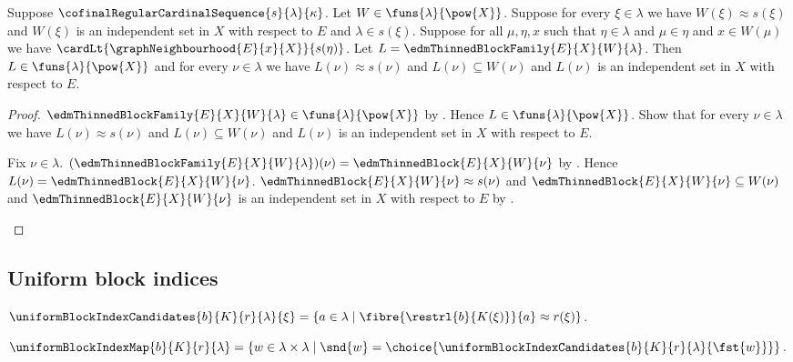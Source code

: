 \begin{theorem}\label{edm_thinned_block_family_properties}
    Suppose $\cofinalRegularCardinalSequence{s}{\lambda}{\kappa}$.
    Let $W\in\funs{\lambda}{\pow{X}}$.
    Suppose for every $\xi\in\lambda$ we have
        $W(\xi)\approx s(\xi)$ and
        $W(\xi)$ is an independent set in $X$ with respect to $E$ and
        $\lambda\in s(\xi)$.
    Suppose for all $\mu,\eta,x$ such that $\eta\in\lambda$ and
        $\mu\in\eta$ and $x\in W(\mu)$ we have
        $\cardLt{\graphNeighbourhood{E}{x}{X}}{s(\eta)}$.
    Let $L=\edmThinnedBlockFamily{E}{X}{W}{\lambda}$.
    Then $L\in\funs{\lambda}{\pow{X}}$ and
        for every $\nu\in\lambda$ we have
            $L(\nu)\approx s(\nu)$ and $L(\nu)\subseteq W(\nu)$ and
            $L(\nu)$ is an independent set in $X$ with respect to $E$.
\end{theorem}
\begin{proof}
    $\edmThinnedBlockFamily{E}{X}{W}{\lambda}
        \in\funs{\lambda}{\pow{X}}$ by
        .
    Hence $L\in\funs{\lambda}{\pow{X}}$.
    Show that for every $\nu\in\lambda$ we have
        $L(\nu)\approx s(\nu)$ and $L(\nu)\subseteq W(\nu)$ and
        $L(\nu)$ is an independent set in $X$ with respect to $E$.
    \begin{subproof}
        Fix $\nu\in\lambda$.
        $(\edmThinnedBlockFamily{E}{X}{W}{\lambda})(\nu)
            =\edmThinnedBlock{E}{X}{W}{\nu}$ by
            .
        Hence $L(\nu)=\edmThinnedBlock{E}{X}{W}{\nu}$.
        $\edmThinnedBlock{E}{X}{W}{\nu}\approx s(\nu)$ and
            $\edmThinnedBlock{E}{X}{W}{\nu}\subseteq W(\nu)$ and
            $\edmThinnedBlock{E}{X}{W}{\nu}$ is an independent set in $X$
                with respect to $E$ by
            .
    \end{subproof}
\end{proof}

\subsection{Uniform block indices}

\begin{definition}\label{uniform_block_index_candidates}
    $\uniformBlockIndexCandidates{b}{K}{r}{\lambda}{\xi}
        =\{a\in\lambda\mid
            \fibre{\restrl{b}{K(\xi)}}{a}\approx r(\xi)\}$.
\end{definition}

\begin{definition}\label{uniform_block_index_map}
    $\uniformBlockIndexMap{b}{K}{r}{\lambda}
        =\{w\in\lambda\times\lambda\mid
            \snd{w}=\choice{\uniformBlockIndexCandidates
                {b}{K}{r}{\lambda}{\fst{w}}}\}$.
\end{definition}

